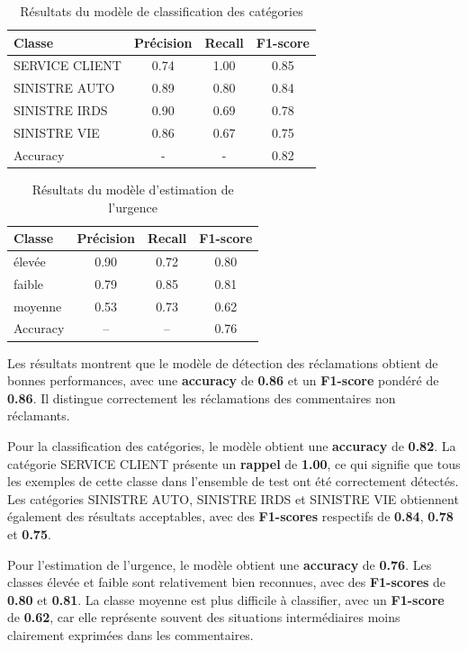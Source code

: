\documentclass[12pt,a4paper,oneside]{report}
\begin{document}
\begin{table}[H]
\centering
\caption{Résultats du modèle de classification des catégories}
\begin{tabular}{|l|c|c|c|}
\hline
Classe & Précision & Recall & F1-score \\
\hline
SERVICE CLIENT & 0.74 & 1.00 & 0.85 \\
SINISTRE AUTO & 0.89 & 0.80 & 0.84 \\
SINISTRE IRDS & 0.90 & 0.69 & 0.78 \\
SINISTRE VIE & 0.86 & 0.67 & 0.75 \\
\hline
Accuracy & - & - & 0.82 \\
\hline
\end{tabular}
\end{table}


\begin{table}[H]
\centering
\caption{Résultats du modèle d'estimation de l'urgence}
\begin{tabular}{|l|c|c|c|}
\hline
Classe & Précision & Recall & F1-score \\
\hline
élevée & 0.90 & 0.72 & 0.80 \\
faible & 0.79 & 0.85 & 0.81 \\
moyenne & 0.53 & 0.73 & 0.62 \\
\hline
Accuracy & -- & -- & 0.76 \\
\hline
\end{tabular}
\end{table}


Les résultats montrent que le modèle de détection des réclamations obtient de bonnes performances, avec une \textbf{accuracy} de \textbf{0.86} et un \textbf{F1-score} pondéré de \textbf{0.86}. Il distingue correctement les réclamations des commentaires non réclamants.

Pour la classification des catégories, le modèle obtient une \textbf{accuracy} de \textbf{0.82}. La catégorie SERVICE CLIENT présente un \textbf{rappel} de \textbf{1.00}, ce qui signifie que tous les exemples de cette classe dans l’ensemble de test ont été correctement détectés. Les catégories SINISTRE AUTO, SINISTRE IRDS et SINISTRE VIE obtiennent également des résultats acceptables, avec des \textbf{F1-scores} respectifs de \textbf{0.84}, \textbf{0.78} et \textbf{0.75}.

Pour l’estimation de l’urgence, le modèle obtient une \textbf{accuracy} de \textbf{ 0.76}. Les classes élevée et faible sont relativement bien reconnues, avec des \textbf{F1-scores} de \textbf{0.80} et \textbf{0.81}. La classe moyenne est plus difficile à classifier, avec un \textbf{F1-score} de \textbf{0.62}, car elle représente souvent des situations intermédiaires moins clairement exprimées dans les commentaires.
\end{document}
